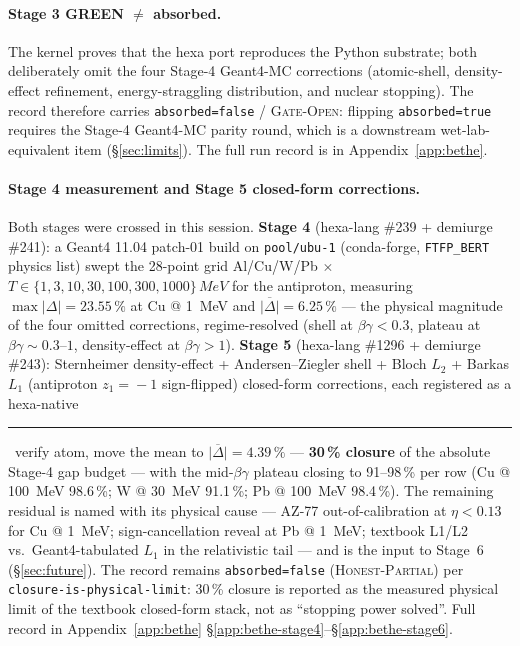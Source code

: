 \documentclass[11pt,a4paper]{article}
\newcommand{\tierdisc}[1]{\textcolor{#1}{\rule[0.05ex]{1.0ex}{1.0ex}}}
\newcommand{\tierGreen}{\tierdisc{green!60!black}}
\begin{document}
\paragraph{Stage 3 GREEN $\ne$ absorbed.} The kernel proves that the
hexa port reproduces the Python substrate; both deliberately omit the
four Stage-4 Geant4-MC corrections (atomic-shell, density-effect
refinement, energy-straggling distribution, and nuclear stopping). The
record therefore carries \texttt{absorbed=false} / \textsc{Gate-Open}:
flipping \texttt{absorbed=true} requires the Stage-4 Geant4-MC parity
round, which is a downstream wet-lab-equivalent item
(\S\ref{sec:limits}). The full run record is in
Appendix~\ref{app:bethe}.

\paragraph{Stage 4 measurement and Stage 5 closed-form corrections.}
Both stages were crossed in this session. \textbf{Stage 4} (hexa-lang
\#239 + demiurge \#241): a Geant4 11.04 patch-01 build on
\texttt{pool/ubu-1} (conda-forge, \texttt{FTFP\_BERT} physics list)
swept the 28-point grid Al/Cu/W/Pb $\times$
$T\in\{1,3,10,30,100,300,1000\}\,\si{MeV}$ for the antiproton, measuring
$\max|\Delta|\!=\!23.55\,\%$ at Cu @ \SI{1}{MeV} and
$\overline{|\Delta|}\!=\!6.25\,\%$ --- the physical magnitude of the four
omitted corrections, regime-resolved (shell at $\beta\gamma\!<\!0.3$,
plateau at $\beta\gamma\!\sim\!0.3$--$1$, density-effect at
$\beta\gamma\!>\!1$). \textbf{Stage 5} (hexa-lang \#1296 +
demiurge \#243): Sternheimer density-effect + Andersen--Ziegler shell +
Bloch $L_2$ + Barkas $L_1$ (antiproton $z_1\!=\!-1$ sign-flipped)
closed-form corrections, each registered as a hexa-native \tierGreen\
verify atom, move the mean to $\overline{|\Delta|}\!=\!4.39\,\%$ ---
\textbf{30\,\% closure} of the absolute Stage-4 gap budget ---
with the mid-$\beta\gamma$ plateau closing to 91--98\,\% per row
(Cu @ \SI{100}{MeV} 98.6\,\%; W @ \SI{30}{MeV} 91.1\,\%;
Pb @ \SI{100}{MeV} 98.4\,\%). The remaining residual is named with its
physical cause --- AZ-77 out-of-calibration at $\eta\!<\!0.13$ for
Cu @ \SI{1}{MeV}; sign-cancellation reveal at Pb @ \SI{1}{MeV};
textbook L1/L2 vs.\ Geant4-tabulated $L_1$ in the relativistic tail ---
and is the input to Stage~6 (\S\ref{sec:future}). The record remains
\texttt{absorbed=false} (\textsc{Honest-Partial}) per
\texttt{closure-is-physical-limit}: 30\,\%
closure is reported as the measured physical limit of the textbook
closed-form stack, not as ``stopping power solved''.
Full record in Appendix~\ref{app:bethe} \S\ref{app:bethe-stage4}--\S\ref{app:bethe-stage6}.
\end{document}
